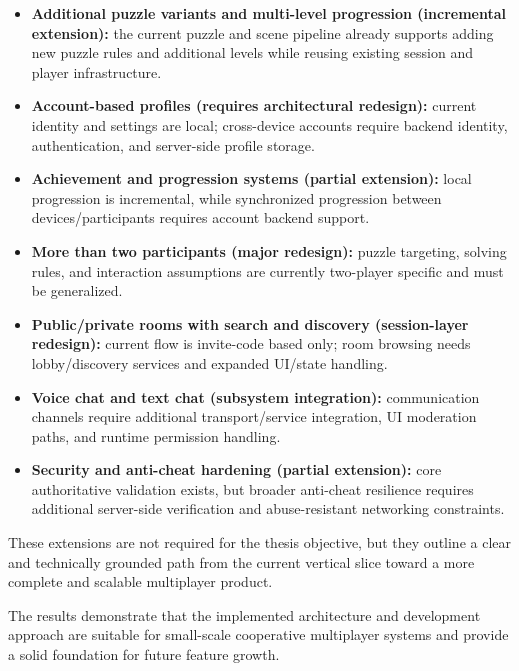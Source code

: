 \begin{itemize}
\item \textbf{Additional puzzle variants and multi-level progression (incremental extension):} the current puzzle and scene pipeline already supports adding new puzzle rules and additional levels while reusing existing session and player infrastructure.
\item \textbf{Account-based profiles (requires architectural redesign):} current identity and settings are local; cross-device accounts require backend identity, authentication, and server-side profile storage.
\item \textbf{Achievement and progression systems (partial extension):} local progression is incremental, while synchronized progression between devices/participants requires account backend support.
\item \textbf{More than two participants (major redesign):} puzzle targeting, solving rules, and interaction assumptions are currently two-player specific and must be generalized.
\item \textbf{Public/private rooms with search and discovery (session-layer redesign):} current flow is invite-code based only; room browsing needs lobby/discovery services and expanded UI/state handling.
\item \textbf{Voice chat and text chat (subsystem integration):} communication channels require additional transport/service integration, UI moderation paths, and runtime permission handling.
\item \textbf{Security and anti-cheat hardening (partial extension):} core authoritative validation exists, but broader anti-cheat resilience requires additional server-side verification and abuse-resistant networking constraints.
\end{itemize}

These extensions are not required for the thesis objective, but they outline a clear and technically grounded path from the current vertical slice toward a more complete and scalable multiplayer product.

The results demonstrate that the implemented architecture and development approach are suitable for small-scale cooperative multiplayer systems and provide a solid foundation for future feature growth.
